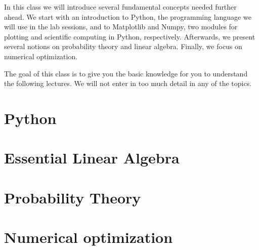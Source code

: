 
In this class we will introduce several fundamental concepts needed further ahead. We start with an introduction to Python, the programming language we will use in the lab sessions, and to Matplotlib and Numpy, two modules for plotting and scientific computing in Python, respectively. Afterwards, we present several notions on probability theory and linear algebra. Finally, we focus on numerical optimization. 

The goal of this class is to give you the basic knowledge for you to understand the following lectures. We will not enter in too much detail in any of the topics. 


\section{Python}


\section{Essential Linear Algebra}


\section{Probability Theory}


\section{Numerical optimization}







